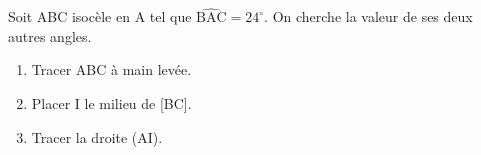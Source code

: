 \documentclass[exercice]{thedocument}%
\begin{document}
%
    Soit ABC isocèle en A tel que $\widehat{\text{BAC}}=24^\circ$. On cherche la
    valeur de ses deux autres angles.
    \begin{enumerate}
        \item Tracer ABC à main levée.
        \item Placer I le milieu de [BC].
        \item Tracer la droite (AI).
    \end{enumerate}
\end{document}

